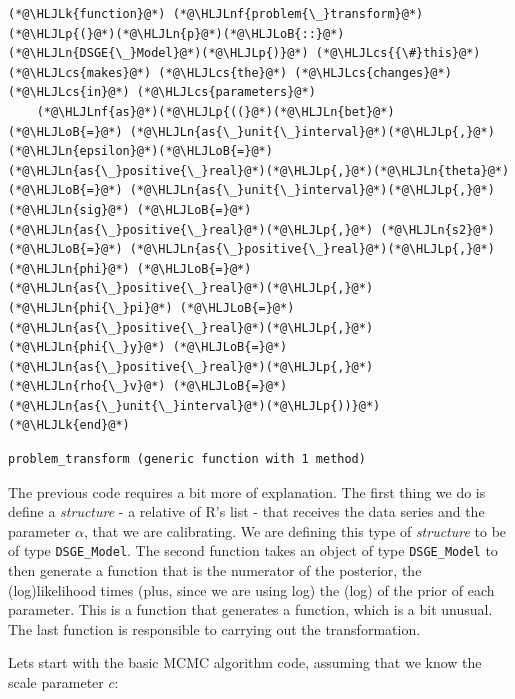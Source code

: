 \documentclass[12pt,a4paper]{article}
\newcommand{\HLJLk}[1]{\textcolor[RGB]{148,91,176}{\textbf{#1}}}
\newcommand{\HLJLn}[1]{#1}
\newcommand{\HLJLnf}[1]{\textcolor[RGB]{66,102,213}{#1}}
\newcommand{\HLJLoB}[1]{\textcolor[RGB]{102,102,102}{\textbf{#1}}}
\newcommand{\HLJLp}[1]{#1}
\newcommand{\HLJLcs}[1]{\textcolor[RGB]{153,153,119}{\textit{#1}}}
\begin{document}
\begin{lstlisting}
(*@\HLJLk{function}@*) (*@\HLJLnf{problem{\_}transform}@*)(*@\HLJLp{(}@*)(*@\HLJLn{p}@*)(*@\HLJLoB{::}@*)(*@\HLJLn{DSGE{\_}Model}@*)(*@\HLJLp{)}@*) (*@\HLJLcs{{\#}this}@*) (*@\HLJLcs{makes}@*) (*@\HLJLcs{the}@*) (*@\HLJLcs{changes}@*) (*@\HLJLcs{in}@*) (*@\HLJLcs{parameters}@*)
    (*@\HLJLnf{as}@*)(*@\HLJLp{((}@*)(*@\HLJLn{bet}@*) (*@\HLJLoB{=}@*) (*@\HLJLn{as{\_}unit{\_}interval}@*)(*@\HLJLp{,}@*) (*@\HLJLn{epsilon}@*)(*@\HLJLoB{=}@*)(*@\HLJLn{as{\_}positive{\_}real}@*)(*@\HLJLp{,}@*)(*@\HLJLn{theta}@*) (*@\HLJLoB{=}@*) (*@\HLJLn{as{\_}unit{\_}interval}@*)(*@\HLJLp{,}@*) (*@\HLJLn{sig}@*) (*@\HLJLoB{=}@*) (*@\HLJLn{as{\_}positive{\_}real}@*)(*@\HLJLp{,}@*) (*@\HLJLn{s2}@*) (*@\HLJLoB{=}@*) (*@\HLJLn{as{\_}positive{\_}real}@*)(*@\HLJLp{,}@*) (*@\HLJLn{phi}@*) (*@\HLJLoB{=}@*) (*@\HLJLn{as{\_}positive{\_}real}@*)(*@\HLJLp{,}@*) (*@\HLJLn{phi{\_}pi}@*) (*@\HLJLoB{=}@*) (*@\HLJLn{as{\_}positive{\_}real}@*)(*@\HLJLp{,}@*) (*@\HLJLn{phi{\_}y}@*) (*@\HLJLoB{=}@*) (*@\HLJLn{as{\_}positive{\_}real}@*)(*@\HLJLp{,}@*) (*@\HLJLn{rho{\_}v}@*) (*@\HLJLoB{=}@*) (*@\HLJLn{as{\_}unit{\_}interval}@*)(*@\HLJLp{))}@*)
(*@\HLJLk{end}@*)
\end{lstlisting}

\begin{lstlisting}
problem_transform (generic function with 1 method)
\end{lstlisting}


The previous code requires a bit more of explanation. The first thing we do is define a \emph{structure} - a relative of R's list - that receives the data series and the parameter $\alpha$, that we are calibrating. We are defining this type of \emph{structure} to be of type \texttt{DSGE\_Model}. The second function takes an object of type \texttt{DSGE\_Model} to then generate a function that is the numerator of the posterior, the (log)likelihood times (plus, since we are using log) the (log) of the prior of each parameter. This is a function that generates a function, which is a bit unusual. The last function is responsible to carrying out the transformation.

Lets start with the basic MCMC algorithm code, assuming that we know the scale parameter $c$:
\end{document}
